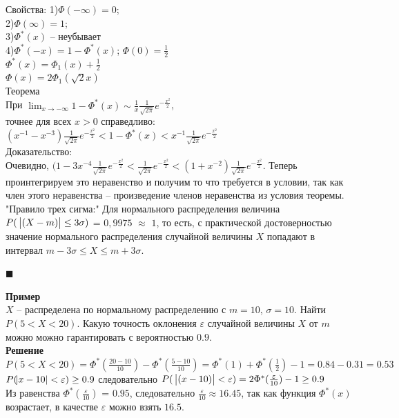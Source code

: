 \documentclass[russian, 12pt, fleqn]{article}
\begin{document}
Свойства:
1)$\Phi(-\infty) = 0$;\\
2)$\Phi(\infty) = 1$;\\
3)$\Phi^*(x)$ -- неубывает\\
4)$\Phi^*(-x) = 1 - \Phi^*(x)$; $\Phi(0) = \frac{1}{2}$\\
$\Phi^*(x) = \Phi_1(x) + \frac{1}{2}$\\
$\Phi(x) = 2 \Phi_1(\sqrt{2}{x})$\\
$\textbf{Теорема}$\\
При $\displaystyle{  \lim_{x\to{-\infty}}  } 1 - \Phi^*(x) \sim  \frac{1}{x} \frac{1}{\sqrt{2\pi}} e^{-\frac{x^2}{2}}  $,\\ точнее для всех $x  > 0$ справедливо:
$(x^{-1} - x^{-3})\frac{1}{\sqrt{2\pi}}e^{-\frac{x^2}{2}} < 1 - \Phi^*(x) < x^{-1}\frac{1}{\sqrt{2\pi}} e^{-\frac{x^2}{2}}$\\
Доказательство:\\
Очевидно, $(1-3x^{-4}\frac{1}{\sqrt{2\pi}} e^{-\frac{x^2}{2}} < \frac{1}{\sqrt{2\pi}} e ^{- \frac{x^2}{2} } < (1 + x^{-2}) \frac{1}{\sqrt{2\pi}} e^{-\frac{x^2}{2}}$. Теперь проинтегрируем это неравенство  и получим то что требуется в условии, так как член этого неравенства -- произведение членов неравенства из условия теоремы.\\
"Правило трех сигма:" Для нормального распределения величина\\ $P(\ \abs{(X-m)} \leq 3\sigma)$ = $0,9975$ $\approx$ $1$, то есть, с практической достоверностью значение нормального распределения случайной величины $X$ попадают в интервал $m-3\sigma\leq X \leq m+ 3\sigma$.\\
\begin{flushright}\(\blacksquare\)\end{flushright}
\textbf{Пример} \\
$X$ -- распределена по нормальному распределению с $m=10$, $\sigma=10$. Найти $P(5<X<20)$. Какую точность оклонения $\varepsilon$ случайной величины $X$ от $m$ можно можно гарантировать с вероятностью $0.9$.\\
\textbf{Решение}\\
$P(5<X<20)  = \Phi^*(\frac{20 - 10}{10}) - \Phi^*(\frac{5 - 10}{10}) = \Phi^*(1) + \Phi^*(\frac{1}{2}) - 1 = 0.84 - 0.31 = 0.53$\\ 
$P(\abs{x - 10} < \varepsilon) \geq 0.9$ следовательно $P(\ \abs{(x - 10)} < \varepsilon) = 2\Phi^*(\frac{\varepsilon}{10}) - 1 \geq 0.9$\\
Из равенства $\Phi^*(\frac{\varepsilon}{10}) $ = $0.95$, следовательно $\frac{\varepsilon}{10} \approx 16.45$, так как функция $ \Phi^*(x)$ возрастает, в качестве
 $\varepsilon$ можно взять $16.5$.
\newpage
\end{document}
